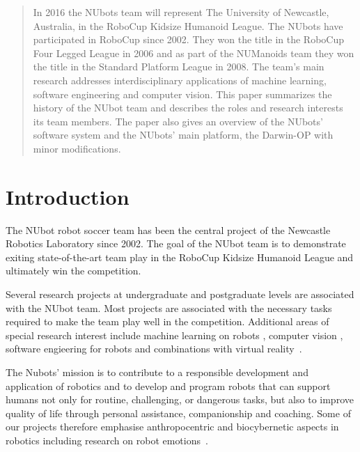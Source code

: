 \documentclass{llncs}
\begin{document}
\begin{abstract}
In 2016 the NUbots team will represent The University of Newcastle, Australia, in the RoboCup Kidsize Humanoid League. The NUbots have participated in RoboCup since 2002. They won the title in the RoboCup Four Legged League in 2006 and as part of the NUManoids team they won the title in the Standard Platform League in 2008. The team's main research addresses interdisciplinary applications of machine learning, software engineering and computer vision. This paper summarizes the history of the NUbot team and describes the roles and research interests its team members. The paper also gives an overview of the NUbots'  software system and the NUbots' main platform, the Darwin-OP with minor modifications. 

\end{abstract}

%
\section{Introduction}
The NUbot robot soccer team has been the central project of the Newcastle Robotics Laboratory since 2002. The goal of the NUbot team is to demonstrate exiting state-of-the-art team play in the RoboCup Kidsize Humanoid League and ultimately win the competition.

Several research projects at undergraduate and postgraduate levels are associated with the NUbot team. Most projects are associated with the necessary tasks required to make the team play well in the competition. Additional areas of special research interest include machine learning on robots \cite{ChalupEtAlSMC2007,FountainEtAl2014}, computer vision \cite{MetcalfeEtAl2016}, software engieering for robots \cite{HoulistonEtAlNUClear2016} and combinations with virtual reality~\cite{FountainChalup2015}.

The Nubots' mission is to contribute to a responsible development and application of robotics and to develop and program robots that can support humans not only for routine, challenging, or dangerous tasks, but also to improve quality of life through personal assistance, companionship and coaching. Some of our projects therefore emphasise anthropocentric and biocybernetic aspects in robotics including research on robot emotions~\cite{ChalupOstwald2009,WalkerChalup2015,HongEtAl2014,WongEtAl2012,WongEtAl2013}.
\end{document}
